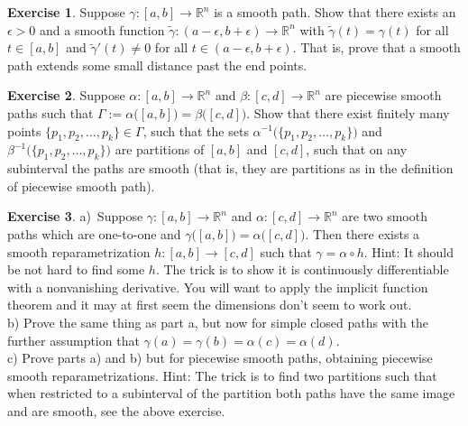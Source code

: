 \documentclass[12pt]{book}
\newcommand{\R}{{\mathbb{R}}}
\theoremstyle{plain}
\theoremstyle{remark}
\theoremstyle{definition}
\theoremstyle{exercise}
\newtheorem{exercise}{Exercise}[section]
\theoremstyle{example}
\begin{document}
\begin{exercise}
Suppose $\gamma \colon [a,b] \to \R^n$ is a smooth path.
Show that there exists an $\epsilon > 0$ and a smooth function
$\tilde{\gamma} \colon (a-\epsilon,b+\epsilon) \to \R^n$
with $\tilde{\gamma}(t) = \gamma(t)$ for all $t \in [a,b]$
and $\tilde{\gamma}'(t) \not= 0$ for all $t \in 
(a-\epsilon,b+\epsilon)$.  That is, prove that a smooth path extends
some small distance past the end points.
\end{exercise}

\begin{exercise} 
Suppose $\alpha \colon [a,b] \to \R^n$ and
$\beta \colon [c,d] \to \R^n$ are piecewise smooth paths such that
$\Gamma := \alpha\bigl([a,b]\bigr) = \beta\bigl([c,d]\bigr)$.
Show that there exist finitely many points
$\{ p_1,p_2,\ldots,p_k\} \in \Gamma$, such that
the sets
$\alpha^{-1}\bigl( \{ p_1,p_2,\ldots,p_k\} \bigr)$
and
$\beta^{-1}\bigl( \{ p_1,p_2,\ldots,p_k\} \bigr)$
are partitions of $[a,b]$ and $[c,d]$, such that on any subinterval
the paths are smooth (that is, they are partitions as in the definition
of piecewise smooth path).
\end{exercise}

\begin{exercise}
a)~Suppose $\gamma \colon [a,b] \to \R^n$ and $\alpha \colon [c,d] \to \R^n$
are two smooth paths which are one-to-one and
$\gamma\bigl([a,b]\bigr) = \alpha\bigl([c,d]\bigr)$.  Then
there exists a smooth reparametrization $h \colon [a,b] \to [c,d]$
such that $\gamma = \alpha \circ h$.  Hint: It should be not hard to find
some $h$.  The trick is to show it is continuously differentiable
with a nonvanishing derivative.  You will want to apply the implicit function
theorem and it may at first seem the dimensions don't seem to work out.
\\
b) Prove the same thing as part a, but now for simple closed paths with the
further assumption that $\gamma(a) = \gamma(b) = \alpha(c) = \alpha(d)$.
\\
c) Prove parts a) and b) but for piecewise smooth paths, obtaining
piecewise smooth reparametrizations.  Hint: The trick is to find two
partitions such that when restricted to a subinterval of the partition
both paths have the same image and are smooth, see the above exercise.
\end{exercise}
\end{document}
